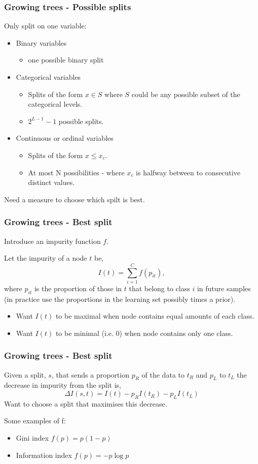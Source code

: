 \documentclass{beamer}
\begin{document}
\begin{frame}
	\frametitle{Growing trees - Possible splits}
	Only split on one variable:
	\begin{itemize}
		\item Binary variables 
		\begin{itemize}
			\item one possible binary split
		\end{itemize}
		\item Categorical variables
		\begin{itemize}
			\item Splits of the form $x \in S$ where $S$ could be any possible subset of the categorical levels.
			\item  $2^{L-1} - 1$ possible splits.
		\end{itemize}
		\item Continuous or ordinal variables 
		\begin{itemize}
			\item Splits of the form $x \le x_c$.
			\item  At most N possibilities  - where $x_c$ is halfway between to consecutive distinct values.
		\end{itemize}   
	\end{itemize}
	Need a measure to choose which spilt is best.
\end{frame}

\begin{frame}
	\frametitle{Growing trees - Best split}	
	Introduce an impurity function $f$.
	
	Let the impurity of a node $t$ be, 
	\[
	I(t) = \sum_{i=1}^C f(p_{it}),
	\]
	where $p_{it}$ is the proportion of those in $t$ that belong to class $i$ in future samples (in practice use the proportions in the learning set possibly times a prior).
	
	\begin{itemize}
		\item Want $I(t)$ to be maximal when node contains equal amounts of each class.
		\item Want $I(t)$ to be minimal (i.e. 0) when node contains only one class.
	\end{itemize}
\end{frame}

\begin{frame}	
\frametitle{Growing trees - Best split}	
Given a split, $s$, that sends a proportion $p_R$ of the data to $t_R$ and $p_L$	to $t_L$ the decrease in impurity from the split is, 
	\[
	\Delta I(s,t) = I(t) - p_RI(t_R) - p_LI(t_L)
	\]
Want to choose a split that maximises this decrease.

Some examples of f:
\begin{itemize}
	\item Gini index $f(p) = p(1-p)$
	\item Information index $f(p) = -p\log{p}$
\end{itemize}
\end{frame}
\end{document}

